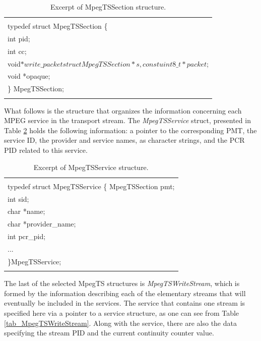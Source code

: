 \documentclass[
	12pt,				%
	openright,			%
	twoside,			%
	a4paper,			%
	brazil,
	french,				%
	english
	]{abntex2}
\begin{document}
\begin{table}[!htpd]
\label{tab_MpegTSSection}
\caption{ Excerpt of MpegTSSection structure.}
\begin{center}
\begin{tabular}{|l|}
\hline
\\
typedef struct MpegTSSection \{\\
	int pid;\\
	int cc;\\
	void\(*write\_packet\)\(struct MpegTSSection *s, const uint8\_t *packet\);\\
	void *opaque;\\
\} MpegTSSection;\\
 \\
\hline
\end{tabular}
\end{center}
\end{table}

What follows is the structure that organizes the information concerning each MPEG service in the transport stream. The \textit{MpegTSService} struct, presented in Table \ref{tab_MpegTSService} holds the following information: a pointer to the corresponding PMT, the service ID, the provider and service names, as character strings, and the PCR PID related to this service.

\begin{table}[!htpd]
\label{tab_MpegTSService}
\caption{ Excerpt of MpegTSService structure.}
\begin{center}
\begin{tabular}{|l|}
\hline
\\
typedef struct MpegTSService \{
MpegTSSection pmt; \\
int sid; \\
char *name;\\
char *provider\_name;\\
int pcr\_pid;\\
...\\
\}MpegTSService;\\
 \\
\hline
\end{tabular}
\end{center}
\end{table}

The last of the selected MpegTS structures is \textit{MpegTSWriteStream}, which is formed by the information describing each of the elementary streams that will eventually be included in the services. The service that contains one stream is specified here via a pointer to a service structure, as one can see from Table \ref{tab_MpegTSWriteStream}. Along with the service, there are also the data specifying the stream PID and the current continuity counter value.
\end{document}
